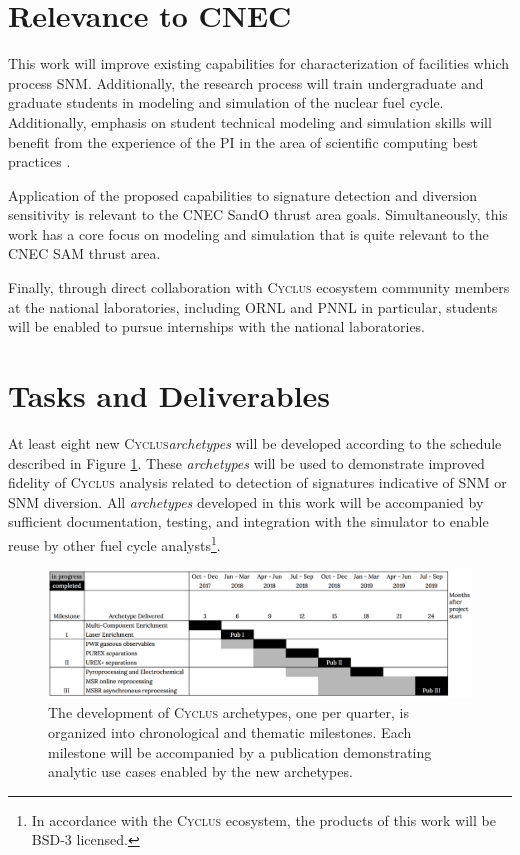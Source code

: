 \documentclass[11pt,letterpaper]{article}
\newcommand{\Cyclus}{\textsc{Cyclus}\xspace}%
\begin{document}
\section{Relevance to CNEC}
This work will improve existing capabilities for characterization of facilities
which process \gls{SNM}. Additionally, the research process will train 
undergraduate and graduate students in modeling and simulation of the nuclear 
fuel cycle.  Additionally, emphasis on student
technical modeling and simulation skills will benefit from the experience of the 
\gls{PI} in the area of scientific computing best practices 
\cite{scopatz_effective_2015,wilson_best_2014,huff_lessons_2017,huff_case_2017}.

Application of the proposed capabilities to signature detection and diversion 
sensitivity is relevant to the \gls{CNEC} \gls{SandO} thrust area goals.  
Simultaneously, this work has a core focus on modeling and simulation that is 
quite relevant to the \gls{CNEC} \gls{SAM} thrust area.  

Finally, through direct collaboration with \Cyclus ecosystem community members 
at the national laboratories, including \gls{ORNL} and \gls{PNNL} in particular, students will be enabled to pursue internships with the national laboratories.

\section{Tasks and Deliverables}

At least eight new \Cyclus \emph{archetypes} will be developed according to the 
schedule described in Figure \ref{fig:milestones}.  These \emph{archetypes} 
will be used to demonstrate improved fidelity of \Cyclus analysis related to 
detection of signatures indicative of \gls{SNM} or \gls{SNM} diversion. 
All \emph{archetypes} developed in this work will be accompanied by sufficient 
documentation, testing, and integration with the simulator to enable reuse by 
other fuel cycle analysts\footnote{In accordance with the \Cyclus ecosystem, 
the products of this work will be BSD-3 licensed.}.


\begin{figure}[htbp!]
        \begin{center}
                \includegraphics[width=\textwidth]{milestones.png}
        \end{center}
        \caption{The development of \Cyclus archetypes, one per quarter, is 
                organized into chronological and thematic milestones. Each 
                milestone will be  accompanied by a publication demonstrating 
        analytic use cases enabled by the new archetypes.} 
        \label{fig:milestones}
\end{figure}
\end{document}
